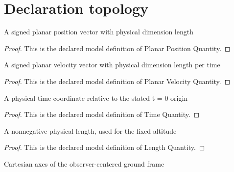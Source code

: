 \section{Declaration topology}
\begin{definition}
  \label{def:physics:phyx-mini-0679:phyxminiproblems-problemphyxmini0679-planarpositionquantity}
  A signed planar position vector with physical dimension length
\end{definition}
\begin{proof}
  This is the declared model definition of Planar Position Quantity.
\end{proof}
\begin{definition}
  \label{def:physics:phyx-mini-0679:phyxminiproblems-problemphyxmini0679-planarvelocityquantity}
  A signed planar velocity vector with physical dimension length per time
\end{definition}
\begin{proof}
  This is the declared model definition of Planar Velocity Quantity.
\end{proof}
\begin{definition}
  \label{def:physics:phyx-mini-0679:phyxminiproblems-problemphyxmini0679-timequantity}
  A physical time coordinate relative to the stated t = 0 origin
\end{definition}
\begin{proof}
  This is the declared model definition of Time Quantity.
\end{proof}
\begin{definition}
  \label{def:physics:phyx-mini-0679:phyxminiproblems-problemphyxmini0679-lengthquantity}
  A nonnegative physical length, used for the fixed altitude
\end{definition}
\begin{proof}
  This is the declared model definition of Length Quantity.
\end{proof}
\begin{definition}
  \label{def:physics:phyx-mini-0679:phyxminiproblems-problemphyxmini0679-diagramaxis}
  Cartesian axes of the observer-centered ground frame
\end{definition}
